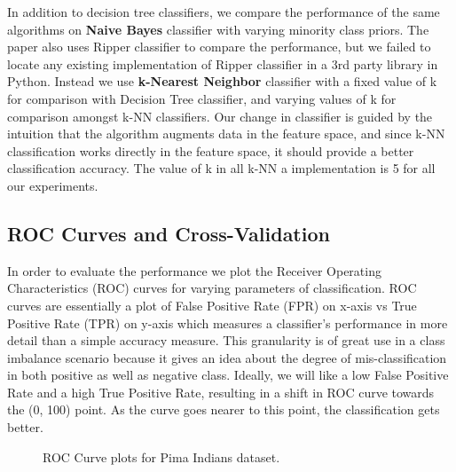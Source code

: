 \documentclass[10pt,journal,compsoc]{IEEEtran}
\begin{document}
In addition to decision tree classifiers, we compare the performance of the same algorithms on \textbf{Naive Bayes} classifier with varying minority class priors.
The paper also uses Ripper classifier to compare the performance, but we failed to locate any existing implementation of Ripper classifier in a 3rd party library in Python.
Instead we use \textbf{k-Nearest Neighbor} classifier with a fixed value of k for comparison with Decision Tree classifier, and varying values of k for comparison amongst k-NN classifiers.
Our change in classifier is guided by the intuition that the algorithm augments data in the feature space, and since k-NN classification works directly in the feature space, it should provide a better classification accuracy.
The value of k in all k-NN a implementation is 5 for all our experiments.

\subsection{ROC Curves and Cross-Validation}
In order to evaluate the performance we plot the Receiver Operating Characteristics (ROC) curves for varying parameters of classification.
ROC curves are essentially a plot of False Positive Rate (FPR) on x-axis vs True Positive Rate (TPR) on y-axis which measures a classifier's performance in more detail than a simple accuracy measure.
This granularity is of great use in a class imbalance scenario because it gives an idea about the degree of mis-classification in both positive as well as negative class.  
Ideally, we will like a low False Positive Rate and a high True Positive Rate, resulting in a shift in ROC curve towards the (0, 100) point. 
As the curve goes nearer to this point, the classification gets better.
\begin{figure}[!b]
\centering
{}
\hfil
{}
\hfil
\caption{ROC Curve plots for Pima Indians dataset.}
\label{fig:pima}
\end{figure}
\end{document}
